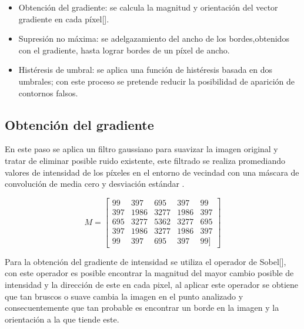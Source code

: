 \begin{itemize}
\item Obtención del gradiente: se calcula la magnitud y orientación del vector gradiente en cada píxel[]. 
\item Supresión no máxima: se adelgazamiento del ancho de los bordes,obtenidos con el gradiente, hasta lograr bordes de un píxel de ancho. 
\item Histéresis de umbral: se aplica una función de histéresis basada en dos umbrales; con este proceso se pretende reducir la posibilidad de aparición de contornos falsos. 
\end{itemize}

\subsection{Obtención del gradiente}

En este paso se aplica un filtro gaussiano para suavizar la imagen original y tratar de eliminar posible ruido existente, este filtrado se realiza promediando valores de intensidad de los píxeles en el entorno de vecindad con una 
máscara de convolución de media cero y desviación estándar \sigma.

\begin{equation}
M =\begin{bmatrix}
99 & 397 & 695 & 397 & 99 \\ 
397 & 1986 & 3277 & 1986 & 397 \\ 
695 & 3277 & 5362 & 3277 & 695 \\ 
397 & 1986 & 3277 & 1986 & 397 \\ 
99 & 397 & 695 & 397 & 99]
\end{bmatrix}
\end{equation}

Para la obtención del gradiente de intensidad se utiliza el operador de Sobel[], con este operador es posible encontrar la magnitud del mayor cambio posible de intensidad y la dirección de este en cada pixel, al aplicar este operador se obtiene que tan bruscos o suave cambia la imagen en el punto analizado y consecuentemente que tan probable es encontrar un borde en la imagen y la orientación a la que tiende este.



